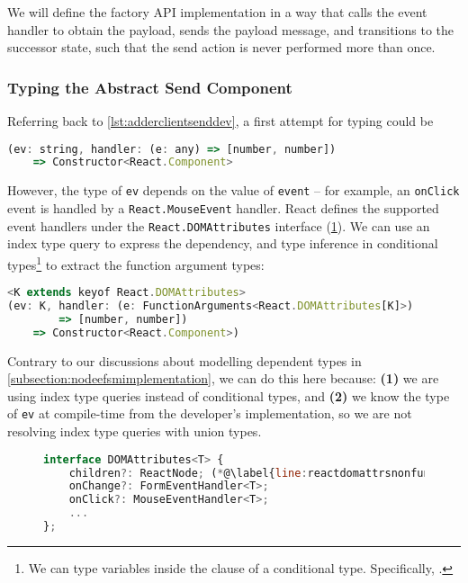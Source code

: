We will define the factory API implementation in a way that
calls the event handler to obtain the payload,
sends the payload message, and transitions to the successor state,
such that the send action is never performed more than once.

\subsubsection{Typing the Abstract Send Component}
Referring back to \cref{lst:adderclientsenddev},
a first attempt for typing  could be

\begin{lstlisting}[language=javascript,numbers=none]
(ev: string, handler: (e: any) => [number, number]) 
	=> Constructor<React.Component>
\end{lstlisting}

However, the type of \texttt{ev} depends on the value of
\texttt{event} -- for example, an \texttt{onClick} event
is handled by a \texttt{React.MouseEvent} handler.
React defines the supported event handlers under the
\texttt{React.DOMAttributes} interface (\cref{lst:reactdomattrs}).
We can use an index type query to express the dependency,
and type inference in conditional types\footnote{
We can  type variables inside the
 clause of a conditional type.
Specifically, .
}
to extract the function argument types:

\begin{lstlisting}[language=javascript,numbers=none]
<K extends keyof React.DOMAttributes>
(ev: K, handler: (e: FunctionArguments<React.DOMAttributes[K]>) 
		=> [number, number])
	=> Constructor<React.Component>)
\end{lstlisting}

Contrary to our discussions about modelling dependent types in
\cref{subsection:nodeefsmimplementation}, we can do this here
because: \textbf{(1)} we are using index type queries instead
of conditional types, and \textbf{(2)} we know the type
of \texttt{ev} at compile-time from the developer's implementation,
so we are not resolving index type queries with union types.

\begin{figure}[!h]
\begin{lstlisting}[language=javascript,numbers=none]
interface DOMAttributes<T> {
	children?: ReactNode; (*@\label{line:reactdomattrsnonfunc}@*)
	onChange?: FormEventHandler<T>;
	onClick?: MouseEventHandler<T>;
	...
};
\end{lstlisting}
\label{lst:reactdomattrs}
\end{figure}

